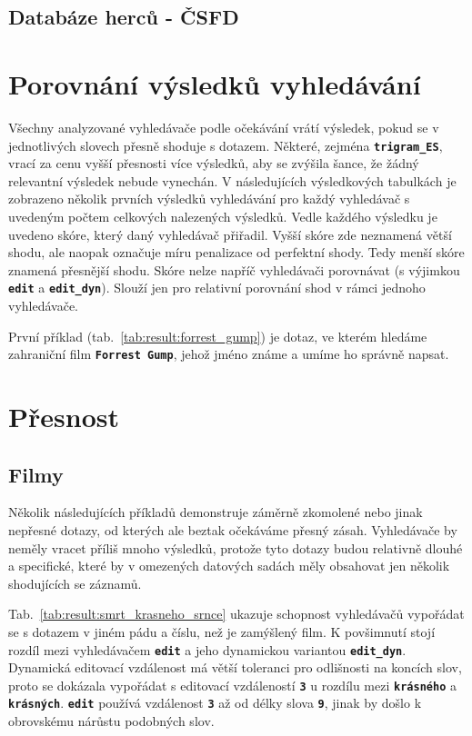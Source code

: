 \documentclass[11pt,letterpaper,oneside,openright]{book}
\newcommand{\bftt}[1]{\texttt{\textbf{#1}}}
\begin{document}
\subsection{Databáze herců - ČSFD}

\section{Porovnání výsledků vyhledávání}
Všechny analyzované vyhledávače podle očekávání vrátí výsledek, pokud se v
jednotlivých slovech přesně shoduje s dotazem. Některé, zejména
\bftt{trigram\_ES}, vrací za cenu vyšší přesnosti více výsledků, aby se zvýšila
šance, že žádný relevantní výsledek nebude vynechán.  V následujících
výsledkových tabulkách je zobrazeno několik prvních výsledků vyhledávání pro
každý vyhledávač s uvedeným počtem celkových nalezených výsledků. Vedle každého
výsledku je uvedeno skóre, který daný vyhledávač přiřadil. Vyšší skóre zde
neznamená větší shodu, ale naopak označuje míru penalizace od perfektní shody.
Tedy menší skóre znamená přesnější shodu. Skóre nelze napříč vyhledávači
porovnávat (s výjimkou \bftt{edit} a \bftt{edit\_dyn}). Slouží jen pro
relativní porovnání shod v rámci jednoho vyhledávače.

\mbox{}\mbox{}

První příklad (tab.~\ref{tab:result:forrest_gump}) je dotaz, ve kterém hledáme
zahraniční film \bftt{Forrest Gump}, jehož jméno známe a umíme ho správně
napsat.

\section{Přesnost}
\subsection{Filmy}
Několik následujících příkladů demonstruje záměrně zkomolené nebo jinak
nepřesné dotazy, od kterých ale beztak očekáváme přesný zásah.
Vyhledávače by neměly vracet příliš mnoho výsledků, protože tyto dotazy
budou relativně dlouhé a specifické, které by v omezených datových
sadách měly obsahovat jen několik shodujících se záznamů.

\mbox{}\mbox{}

Tab.~\ref{tab:result:smrt_krasneho_srnce} ukazuje schopnost vyhledávačů
vypořádat se s dotazem v jiném pádu a číslu, než je zamýšlený film. K
povšimnutí stojí rozdíl mezi vyhledávačem \bftt{edit} a jeho dynamickou
variantou \bftt{edit\_dyn}. Dynamická editovací vzdálenost má větší toleranci
pro odlišnosti na koncích slov, proto se dokázala vypořádat s editovací
vzdáleností \bftt{3} u rozdílu mezi \bftt{krásného} a \bftt{krásných}.
\bftt{edit} používá vzdálenost \bftt{3} až od délky slova \bftt{9}, jinak by
došlo k obrovskému nárůstu podobných slov.
\end{document}
